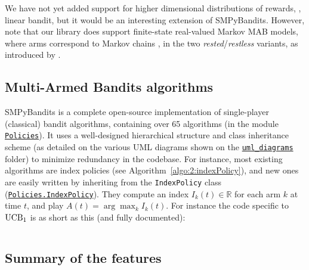 We have not yet added support for higher dimensional distributions of rewards, \eg, linear bandit, but it would be an interesting extension of SMPyBandits.
%
However, note that our library does support finite-state real-valued Markov MAB models, where arms correspond to Markov chains \cite{Norris98}, in the two \emph{rested}/\emph{restless} variants, as introduced by \cite{Anantharam87b}.


\subsection{Multi-Armed Bandits algorithms}

SMPyBandits is a complete open-source implementation of single-player (classical) bandit algorithms,
containing over 65 algorithms (in the module \texttt{\href{https://SMPyBandits.GitHub.io/docs/Policies.html}{Policies}}).
It uses a well-designed hierarchical structure and class inheritance scheme (as detailed on the various UML diagrams shown on the \texttt{\href{https://SMPyBandits.GitHub.io/uml_diagrams/README.html}{uml\_diagrams}} folder) to minimize redundancy in the codebase.
For instance, most existing algorithms are index policies (see Algorithm~\ref{algo:2:indexPolicy}), and new ones are easily written by inheriting from the \texttt{IndexPolicy} class (\texttt{\href{https://SMPyBandits.GitHub.io/docs/Policies.IndexPolicy.html}{Policies.IndexPolicy}}).
They compute an index $I_k(t)\in\mathbb{R}$ for each arm $k$ at time $t$, and play $A(t) = \arg\max_k I_k(t)$.
For instance the code specific to $\mathrm{UCB}_1$ is as short as this (and fully documented):

\begin{small}
    \inputminted[linenos=true,numbersep=5pt,frame=lines,framesep=2mm]{python3}{2-Chapters/3-Chapter/src/example_of_a_IndexPolicy_UCB.py}
\end{small}


\subsection{Summary of the features}

